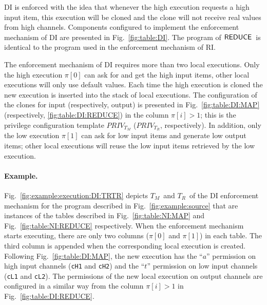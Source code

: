 \documentclass[10pt,a4paper,oneside]{article}
\def\TAV{\ensuremath{T_{M}}}
\def\TPV{\ensuremath{T_{R}}}
\def\sanserif#1{\ensuremath{\sf #1}}
\def\REDUCE{\ensuremath{\sanserif{REDUCE}}}
\def\Prog{\ensuremath{\pi}}
\def\Progl#1{\ensuremath{\Prog[#1]}}
\def\task{\ensuremath{a}}
\def\ttell{\ensuremath{t}}
\def\tindex#1{\ensuremath{\Progl{#1}}}
\def\tcolm{\ensuremath{PRIV_{T_M}}}
\def\tcolr{\ensuremath{PRIV_{T_R}}}
\def\linecode#1{{\texttt{#1}}}
\begin{document}
DI is enforced with the idea that whenever the high execution requests a high input item, this execution will be cloned and the clone will not receive real values from high channels. Components configured to implement the enforcement mechanism of DI are presented in Fig.~\ref{fig:table:DI}. The program of \REDUCE\ is identical to the program used in the enforcement mechanism of RI.

The enforcement mechanism of DI requires more than two local executions. Only the high execution \Progl{0} can ask for and get the high input items, other local executions will only use default values. Each time the high execution is cloned the new execution is inserted into the stack of local executions. The configuration of the clones for input (respectively, output) is presented in Fig.~\ref{fig:table:DI:MAP} (respectively, \ref{fig:table:DI:REDUCE}) in the column $\tindex{i} > 1$; this is the privilege configuration template $\tcolm$ ($\tcolr$, respectively). In addition, only the low execution \Progl{1} can ask for low input items and generate low output items; other local executions will reuse the low input items retrieved by the low execution.

\paragraph{Example.}
Fig.~\ref{fig:example:execution:DI:TRTR} depicts \TAV\ and \TPV\  of the DI enforcement mechanism for the program described in Fig.~\ref{fig:example:source} that are instances of the tables described in Fig.~\ref{fig:table:NI:MAP} and Fig.~\ref{fig:table:NI:REDUCE} respectively. When the enforcement mechanism starts executing, there are only two columns (\Progl{0} and \Progl{1}) in each table. The third column is appended when the corresponding local execution is created. Following Fig.~\ref{fig:table:DI:MAP}, the new execution has the ``$\task$'' permission on high input channels (\linecode{cH1} and \linecode{cH2}) and the ``$\ttell$'' permission on low input channels (\linecode{cL1} and \linecode{cL2}). The permissions of the new local execution on output channels are configured in a similar way from the column $\tindex{i} > 1$ in Fig.~\ref{fig:table:DI:REDUCE}.
\end{document}
